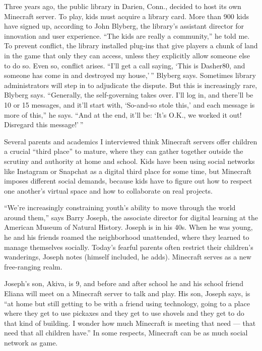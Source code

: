 Three years ago, the public library in Darien, Conn., decided to host
its own Minecraft server. To play, kids must acquire a library card.
More than 900 kids have signed up, according to John Blyberg, the
library's assistant director for innovation and user experience. ``The
kids are really a community,'' he told me. To prevent conflict, the
library installed plug-ins that give players a chunk of land in the game
that only they can access, unless they explicitly allow someone else to
do so. Even so, conflict arises. ``I'll get a call saying, `This is
Dasher80, and someone has come in and destroyed my house,' '' Blyberg
says. Sometimes library administrators will step in to adjudicate the
dispute. But this is increasingly rare, Blyberg says. ``Generally, the
self-­governing takes over. I'll log in, and there'll be 10 or 15
messages, and it'll start with, `So-and-so stole this,' and each message
is more of this,'' he says. ``And at the end, it'll be: `It's O.K., we
worked it out! Disregard this message!' ''

Several parents and academics I interviewed think Minecraft servers
offer children a crucial ``third place'' to mature, where they can
gather together outside the scrutiny and authority at home and school.
Kids have been using social networks like Instagram or Snapchat as a
digital third place for some time, but Minecraft imposes different
social demands, because kids have to figure out how to respect one
another's virtual space and how to collaborate on real projects.

``We're increasingly constraining youth's ability to move through the
world around them,'' says Barry Joseph, the associate director for
digital learning at the American Museum of Natural History. Joseph is in
his 40s. When he was young, he and his friends roamed the neighborhood
unattended, where they learned to manage themselves socially. Today's
fearful parents often restrict their children's wanderings, Joseph notes
(himself included, he adds). Minecraft serves as a new free-­ranging
realm.

Joseph's son, Akiva, is 9, and before and after school he and his school
friend Eliana will meet on a Minecraft server to talk and play. His son,
Joseph says, is ``at home but still getting to be with a friend using
technology, going to a place where they get to use pickaxes and they get
to use shovels and they get to do that kind of building. I wonder how
much Minecraft is meeting that need --- that need that all children
have.'' In some respects, Minecraft can be as much social network as
game.

